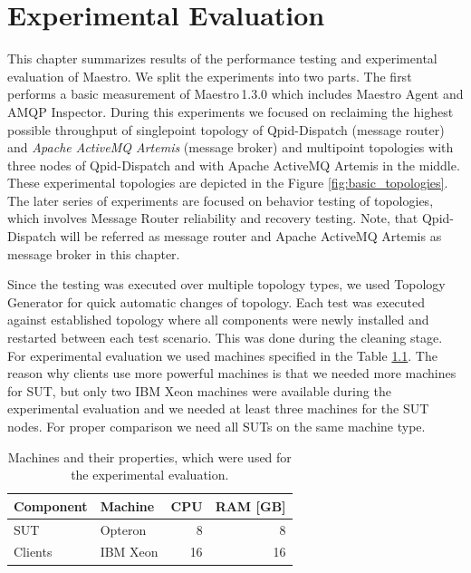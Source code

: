 
\chapter{Experimental Evaluation}
\label{Experimental Evaluation}
This chapter summarizes results of the performance testing and experimental evaluation of Maestro. We split the experiments into two parts. The first performs a basic measurement of Maestro\,1.3.0 which includes Maestro Agent and AMQP Inspector. During this experiments we focused on reclaiming the highest possible throughput of singlepoint topology of Qpid-Dispatch (message router) and \emph{Apache ActiveMQ Artemis} (message broker) and multipoint topologies with three nodes of Qpid-Dispatch and with Apache ActiveMQ Artemis in the middle. These experimental topologies are depicted in the Figure \ref{fig:basic_topologies}. The later series of experiments are focused on behavior testing of topologies, which involves Message Router reliability and recovery testing. Note, that Qpid-Dispatch will be referred as message router and Apache ActiveMQ Artemis as message broker in this chapter.

Since the testing was executed over multiple topology types, we used Topology Generator for quick automatic changes of topology. Each test was executed against established topology where all components were newly installed and restarted between each test scenario. This was done during the cleaning stage. For experimental evaluation we used machines specified in the Table \ref{tab:machines}. The reason why clients use more powerful machines is that we needed more machines for SUT, but only two IBM Xeon machines were available during the experimental evaluation and we needed at least three machines for the SUT nodes. For proper comparison we need all SUTs on the same machine type.

\begingroup
\setlength{\tabcolsep}{10pt} %
\renewcommand{\arraystretch}{1.35} %
	\begin{table}[H]
	\centering
	\begin{tabular}{|l|l|r|r|}
	\hline
	\rowcolor[HTML]{C5E3DF}
	\textbf{Component} & \textbf{Machine} & \textbf{CPU} & \textbf{RAM [GB]} \\ \hline
	SUT & Opteron & 8 & 8 \\ \hline
	Clients & IBM Xeon & 16 & 16 \\ \hline
	\end{tabular}
	\caption{Machines and their properties, which were used for the experimental evaluation.}
	\label{tab:machines}
	\end{table}
\endgroup

